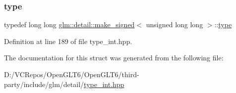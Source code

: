 \subsubsection{\texorpdfstring{type}{type}}
{\footnotesize\ttfamily typedef long long \mbox{\hyperlink{structglm_1_1detail_1_1make__signed}{glm\+::detail\+::make\+\_\+signed}}$<$ unsigned long long $>$\+::\mbox{\hyperlink{structglm_1_1detail_1_1make__signed_3_01unsigned_01long_01long_01_4_a025f1f9880bc973147ffb0371771eb0b}{type}}}



Definition at line 189 of file type\+\_\+int.\+hpp.



The documentation for this struct was generated from the following file\+:\begin{DoxyCompactItemize}
\item 
D\+:/\+V\+C\+Repos/\+Open\+G\+L\+T6/\+Open\+G\+L\+T6/third-\/party/include/glm/detail/\mbox{\hyperlink{type__int_8hpp}{type\+\_\+int.\+hpp}}\end{DoxyCompactItemize}
